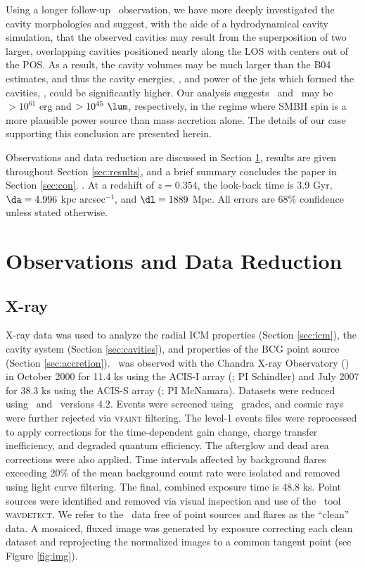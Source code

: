 \documentclass{emulateapj}
\begin{document}
Using a longer follow-up \chandra\ observation, we have more deeply
investigated the cavity morphologies and suggest, with the aide of a
hydrodynamical cavity simulation, that the observed cavities may
result from the superposition of two larger, overlapping cavities
positioned nearly along the LOS with centers out of the POS. As a
result, the cavity volumes may be much larger than the B04 estimates,
and thus the cavity energies, \ecav, and power of the jets which
formed the cavities, \pjet, could be significantly higher. Our
analysis suggests \ecav\ and \pjet\ may be $> 10^{61}$ erg and $>
10^{45} ~\lum$, respectively, in the regime where SMBH spin is a more
plausible power source than mass accretion alone. The details of our
case supporting this conclusion are presented herein.

Observations and data reduction are discussed in Section
\ref{sec:obs}, results are given throughout Section \ref{sec:results},
and a brief summary concludes the paper in Section
\ref{sec:con}. \LCDM. At a redshift of $z = 0.354$, the look-back time
is 3.9 Gyr, $\da = 4.996$ kpc arcsec$^{-1}$, and $\dl = 1889$ Mpc. All
errors are 68\% confidence unless stated otherwise.

\section{Observations and Data Reduction}
\label{sec:obs}

\subsection{X-ray}

X-ray data was used to analyze the radial ICM properties (Section
\ref{sec:icm}), the cavity system (Section \ref{sec:cavities}), and
properties of the BCG point source (Section \ref{sec:accretion}).
\rxj\ was observed with the Chandra X-ray Observatory (\cxo) in
October 2000 for 11.4 ks using the ACIS-I array (; PI Schindler) and July 2007 for
38.3 ks using the ACIS-S array (; PI McNamara). Datasets were reduced using \ciao\ and
\caldb\ versions 4.2. Events were screened using \asca\ grades, and
cosmic rays were further rejected via {\textsc{vfaint}} filtering. The
level-1 events files were reprocessed to apply corrections for the
time-dependent gain change, charge transfer inefficiency, and degraded
quantum efficiency. The afterglow and dead area corrections were also
applied. Time intervals affected by background flares exceeding 20\%
of the mean background count rate were isolated and removed using
light curve filtering. The final, combined exposure time is 48.8
ks. Point sources were identified and removed via visual inspection
and use of the \ciao\ tool {\textsc{wavdetect}}. We refer to the
\cxo\ data free of point sources and flares as the ``clean'' data. A
mosaiced, fluxed image was generated by exposure correcting each clean
dataset and reprojecting the normalized images to a common tangent
point (see Figure \ref{fig:img}).
\end{document}
